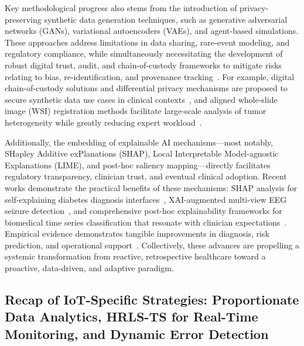 \documentclass[sigconf]{acmart}
\begin{document}
Key methodological progress also stems from the introduction of privacy-preserving synthetic data generation techniques, such as generative adversarial networks (GANs), variational autoencoders (VAEs), and agent-based simulations. These approaches address limitations in data sharing, rare-event modeling, and regulatory compliance, while simultaneously necessitating the development of robust digital trust, audit, and chain-of-custody frameworks to mitigate risks relating to bias, re-identification, and provenance tracking~\cite{ref51,ref91,ref94,ref95}. For example, digital chain-of-custody solutions and differential privacy mechanisms are proposed to secure synthetic data use cases in clinical contexts~\cite{ref91}, and aligned whole-slide image (WSI) registration methods facilitate large-scale analysis of tumor heterogeneity while greatly reducing expert workload~\cite{ref94}.

Additionally, the embedding of explainable AI mechanisms---most notably, SHapley Additive exPlanations (SHAP), Local Interpretable Model-agnostic Explanations (LIME), and post-hoc saliency mapping---directly facilitates regulatory transparency, clinician trust, and eventual clinical adoption. Recent works demonstrate the practical benefits of these mechanisms: SHAP analysis for self-explaining diabetes diagnosis interfaces~\cite{ref87}, XAI-augmented multi-view EEG seizure detection~\cite{ref98}, and comprehensive post-hoc explainability frameworks for biomedical time series classification that resonate with clinician expectations~\cite{ref99}. Empirical evidence demonstrates tangible improvements in diagnosis, risk prediction, and operational support~\cite{ref34,ref51,ref76,ref87,ref91,ref98,ref99}. Collectively, these advances are propelling a systemic transformation from reactive, retrospective healthcare toward a proactive, data-driven, and adaptive paradigm.

\subsection{Recap of IoT-Specific Strategies: Proportionate Data Analytics, HRLS-TS for Real-Time Monitoring, and Dynamic Error Detection}
\end{document}
